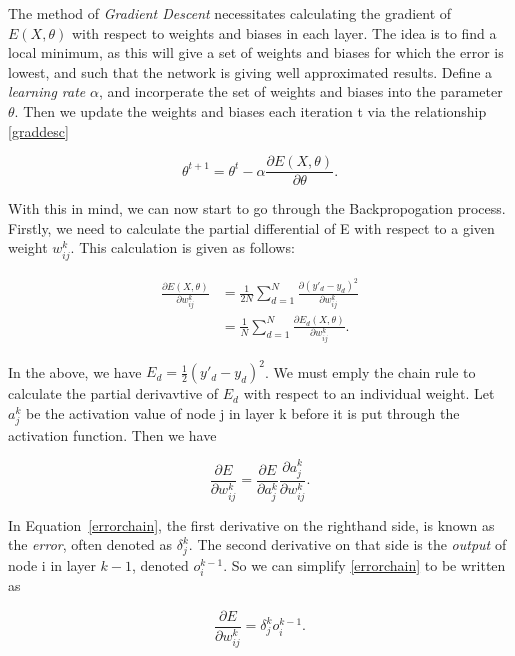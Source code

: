 The method of \textit{Gradient Descent} necessitates calculating the gradient of $E(X,\theta)$ with respect to weights and biases in each layer. The idea is to find a local minimum, as this will
give a set of weights and biases for which the error is lowest, and such that the network is giving well approximated results. Define a \textit{learning rate} $\alpha$, and incorperate the set of weights
and biases into the parameter $\theta$. Then we update the weights and biases each iteration t via the relationship \ref{graddesc}

\begin{equation}
    \label{graddesc}
    \theta^{t+1} = \theta^t - \alpha\frac{\partial E(X,\theta)}{\partial \theta}.
\end{equation}

With this in mind, we can now start to go through the Backpropogation process. Firstly, we need to calculate the partial differential of E with respect to a given weight $w^k_{ij}$. This calculation is given as follows:

\begin{align}
    \frac{\partial E(X,\theta)}{\partial w_{ij}^k} &= \frac{1}{2N}\sum_{d=1}^N\frac{\partial (y'_d-y_d)^2}{\partial w_{ij}^k} \\
                                                   &= \frac{1}{N}\sum^N_{d=1} \frac{\partial E_d(X,\theta)}{\partial w_{ij}^k}.
\end{align}

In the above, we have $E_d = \frac{1}{2}(y'_d-y_d)^2$.  We must emply the chain rule to calculate the partial derivavtive of $E_d$ with respect to an individual weight. 
Let $a_j^k$ be the activation value of node j in layer k before it is put through the activation function. Then we have

\begin{equation}
    \label{errorchain}
    \frac{\partial E}{\partial w_{ij}^k} = \frac{\partial E}{\partial a_j^k}\frac{\partial a_j^k}{\partial w_{ij}^k}.
\end{equation}

In Equation~\ref{errorchain}, the first derivative on the righthand side, is known as the \textit{error}, often denoted as $\delta_j^k$. The second derivative on that side
is the \textit{output} of node i in layer $k-1$, denoted $o_i^{k-1}$. So we can simplify \ref{errorchain} to be written as

\begin{equation}
    \frac{\partial E}{\partial w_{ij}^k} = \delta^k_jo_i^{k-1}.
\end{equation}

